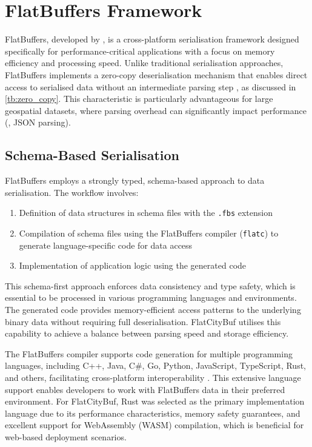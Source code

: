 
\section{FlatBuffers Framework}
\label{tb:flatbuffers}

FlatBuffers, developed by \citet{flatbuffers}, is a cross-platform serialisation framework designed specifically for performance-critical applications with a focus on memory efficiency and processing speed. Unlike traditional serialisation approaches, FlatBuffers implements a zero-copy deserialisation mechanism that enables direct access to serialised data without an intermediate parsing step \citep{flatbuffers_benchmark}, as discussed in \autoref{tb:zero_copy}.
This characteristic is particularly advantageous for large geospatial datasets, where parsing overhead can significantly impact performance (\eg, JSON parsing).

\subsection{Schema-Based Serialisation}
\label{tb:flatbuffers:schema_based_serialisation}

FlatBuffers employs a strongly typed, schema-based approach to data serialisation. The workflow involves:

\begin{enumerate}
  \item Definition of data structures in schema files with the \texttt{.fbs} extension
  \item Compilation of schema files using the FlatBuffers compiler (\texttt{flatc}) to generate language-specific code for data access
  \item Implementation of application logic using the generated code
\end{enumerate}

This schema-first approach enforces data consistency and type safety, which is essential to be processed in various programming languages and environments. The generated code provides memory-efficient access patterns to the underlying binary data without requiring full deserialisation. FlatCityBuf utilises this capability to achieve a balance between parsing speed and storage efficiency.

The FlatBuffers compiler supports code generation for multiple programming languages, including C++, Java, C\#, Go, Python, JavaScript, TypeScript, Rust, and others, facilitating cross-platform interoperability \citep{flatbuffers_support}. This extensive language support enables developers to work with FlatBuffers data in their preferred environment. For FlatCityBuf, Rust was selected as the primary implementation language due to its performance characteristics, memory safety guarantees, and excellent support for WebAssembly (WASM) compilation, which is beneficial for web-based deployment scenarios.

